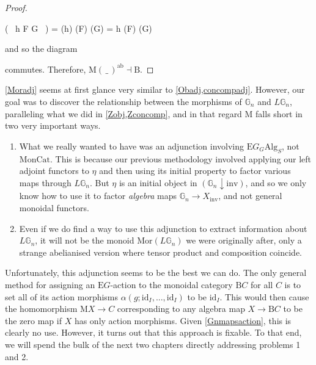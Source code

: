 \begin{proof}
\begin{eq*} ( \, h \circ F \circ G \, ) \quad = \quad {}(h) \circ {}(F) \circ {}(G) \quad = \quad h \circ {}(F) \circ {}(G) \end{eq*}
and so the diagram
\begin{eq*}  \end{eq*}
commutes. Therefore, $\mathrm{M}(\, \_ \,)^{\mathrm{ab}} \dashv \mathrm{B}$.
\end{proof}

\cref{Moradj} seems at first glance very similar to \cref{Obadj,concompadj}. However, our goal was to discover the relationship between the morphisms of $\mathbb{G}_n$ and $L\mathbb{G}_n$, paralleling what we did in \cref{Zobj,Zconcomp}, and in that regard $\mathrm{M}$ falls short in two very important ways. 

\begin{enumerate}
\item What we really wanted to have was an adjunction involving $\mathrm{E}G_G\mathrm{Alg}_{S}$, not $\mathrm{MonCat}$. This is because our previous methodology involved applying our left adjoint functors to $\eta$ and then using its initial property to factor various maps through $L\mathbb{G}_n$. But $\eta$ is an initial object in $(\mathbb{G}_n \downarrow \mathrm{inv})$, and so we only know how to use it to factor \emph{algebra} maps $\mathbb{G}_n \to X_{\mathrm{inv}}$, and not general monoidal functors. 
\item Even if we do find a way to use this adjunction to extract information about $L\mathbb{G}_n$, it will not be the monoid $\mathrm{Mor}(L\mathbb{G}_n)$ we were originally after, only a strange abelianised version where tensor product and composition coincide.  
\end{enumerate}

Unfortunately, this adjunction seems to be the best we can do. The only general method for assigning an $\mathrm{E}G$-action to the monoidal category $\mathrm{B}C$ for all $C$ is to set all of its action morphisms $\alpha(g; \mathrm{id}_I, ..., \mathrm{id}_I)$ to be $\mathrm{id}_I$. This would then cause the homomorphism $\mathrm{M}X \to C$ corresponding to any algebra map $X \to \mathrm{B}C$ to be the zero map if $X$ has only action morphisms. Given \cref{Gnmapsaction}, this is clearly no use. However, it turns out that this approach is fixable. To that end, we will spend the bulk of the next two chapters directly addressing problems 1 and 2. 

